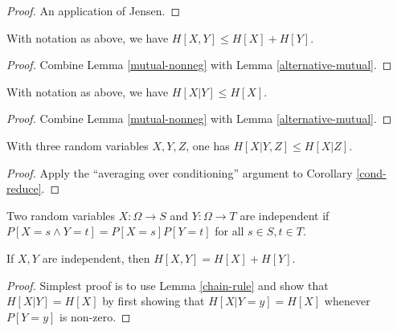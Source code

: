 \begin{proof}  An application of Jensen.
\end{proof}

\begin{corollary}[Subadditivity]\label{subadditive}   With notation as above, we have $H[X,Y] \leq H[X] + H[Y]$.
\end{corollary}

\begin{proof}  Combine Lemma \ref{mutual-nonneg} with Lemma \ref{alternative-mutual}.
\end{proof}

\begin{corollary}\label{cond-reduce}   With notation as above, we have $H[X|Y] \leq H[X]$.
\end{corollary}

\begin{proof}  Combine Lemma \ref{mutual-nonneg} with Lemma \ref{alternative-mutual}.
\end{proof}

\begin{corollary}[Submodularity]\label{submodularity} With three random variables $X,Y,Z$, one has $H[X|Y,Z] \leq H[X|Z]$.
\end{corollary}

\begin{proof} Apply the ``averaging over conditioning'' argument to Corollary \ref{cond-reduce}.
\end{proof}

\begin{definition}\label{independent-def}
Two random variables $X: \Omega \to S$ and $Y: \Omega \to T$ are independent if $P[ X = s \wedge Y = t] = P[X=s] P[Y=t]$ for all $s \in S, t \in T$.
\end{definition}

\begin{lemma}\label{add-entropy}   If $X,Y$ are independent, then $H[X,Y] = H[X] + H[Y]$.
\end{lemma}

\begin{proof} Simplest proof is to use Lemma \ref{chain-rule} and show that $H[X|Y] = H[X]$ by first showing that $H[X|Y=y] = H[X]$ whenever $P[Y=y]$ is non-zero.
\end{proof}
